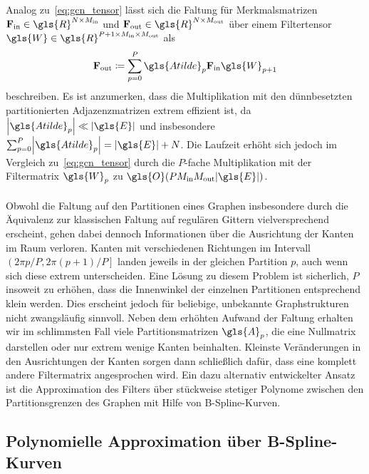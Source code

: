 Analog zu~\eqref{eq:gcn_tensor} lässt sich die Faltung für Merkmalsmatrizen $\ma{F}_{\mathrm{in}} \in \gls{R}^{N \times M_{\mathrm{in}}}$ und $\ma{F}_{\mathrm{out}} \in \gls{R}^{N \times M_{\mathrm{out}}}$ über einem Filtertensor $\gls{W} \in \gls{R}^{P+1 \times M_{\mathrm{in}} \times M_{\mathrm{out}}}$ als
\begin{equation*}
  \ma{F}_{\mathrm{out}} \coloneqq \sum_{p=0}^P \gls{Atilde}_p\ma{F}_{\mathrm{in}}\gls{W}_{p+1}
\end{equation*}
beschreiben.
Es ist anzumerken, dass die Multiplikation mit den dünnbesetzten partitionierten Adjazenzmatrizen extrem effizient ist, da $\left|\gls{Atilde}_p\right| \ll \left|\gls{E}\right|$ und insbesondere $\sum_{p=0}^P \left|\gls{Atilde}_p\right| = \left|\gls{E}\right| + N$.
Die Laufzeit erhöht sich jedoch im Vergleich zu~\eqref{eq:gcn_tensor} durch die $P$-fache Multiplikation mit der Filtermatrix $\gls{W}_p$ zu $\gls{O}\left(PM_{\mathrm{in}}M_{\mathrm{out}}\left|\gls{E}\right|\right)$.
\\\\
Obwohl die Faltung auf den Partitionen eines Graphen insbesondere durch die Äquivalenz zur klassischen Faltung auf regulären Gittern vielversprechend erscheint, gehen dabei dennoch Informationen über die Ausrichtung der Kanten im Raum verloren.
Kanten mit verschiedenen Richtungen im Intervall $\left(2\pi p/P, 2\pi \left(p+1\right)/P\right]$ landen jeweils in der gleichen Partition $p$, auch wenn sich diese \evtl{} extrem unterscheiden.
Eine Lösung zu diesem Problem ist sicherlich, $P$ insoweit zu erhöhen, dass die Innenwinkel der einzelnen Partitionen entsprechend klein werden.
Dies erscheint jedoch für beliebige, unbekannte Graphstrukturen nicht zwangsläufig sinnvoll.
Neben dem erhöhten Aufwand der Faltung erhalten wir im schlimmsten Fall viele Partitionsmatrizen $\gls{A}_p$, die eine Nullmatrix  darstellen oder nur extrem wenige Kanten beinhalten.
Kleinste Veränderungen in den Ausrichtungen der Kanten sorgen dann schließlich dafür, dass eine komplett andere Filtermatrix angesprochen wird.
Ein dazu alternativ entwickelter Ansatz ist die Approximation des Filters über stückweise stetiger Polynome zwischen den Partitionsgrenzen des Graphen mit Hilfe von B-Spline-Kurven.

\subsection{Polynomielle Approximation über B-Spline-Kurven}
\label{bspline}

